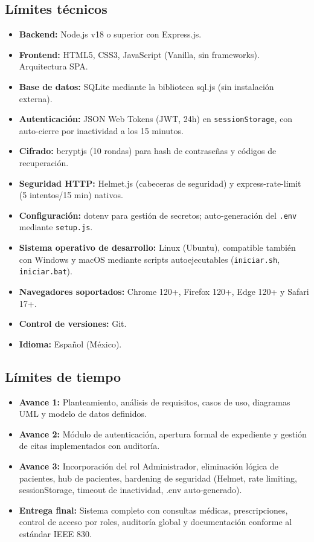 \documentclass[11pt,a4paper]{article}
\begin{document}
\subsection{Límites técnicos}

\begin{itemize}
    \item \textbf{Backend:} Node.js v18 o superior con Express.js.
    \item \textbf{Frontend:} HTML5, CSS3, JavaScript (Vanilla, sin frameworks). Arquitectura SPA.
    \item \textbf{Base de datos:} SQLite mediante la biblioteca sql.js (sin instalación externa).
    \item \textbf{Autenticación:} JSON Web Tokens (JWT, 24h) en \texttt{sessionStorage}, con auto-cierre por inactividad a los 15 minutos.
    \item \textbf{Cifrado:} bcryptjs (10 rondas) para hash de contraseñas y códigos de recuperación.
    \item \textbf{Seguridad HTTP:} Helmet.js (cabeceras de seguridad) y express-rate-limit (5 intentos/15 min) nativos.
    \item \textbf{Configuración:} dotenv para gestión de secretos; auto-generación del \texttt{.env} mediante \texttt{setup.js}.
    \item \textbf{Sistema operativo de desarrollo:} Linux (Ubuntu), compatible también con Windows y macOS mediante scripts autoejecutables (\texttt{iniciar.sh}, \texttt{iniciar.bat}).
    \item \textbf{Navegadores soportados:} Chrome 120+, Firefox 120+, Edge 120+ y Safari 17+.
    \item \textbf{Control de versiones:} Git.
    \item \textbf{Idioma:} Español (México).
\end{itemize}

\subsection{Límites de tiempo}

\begin{itemize}
    \item \textbf{Avance 1:} Planteamiento, análisis de requisitos, casos de uso, diagramas UML y modelo de datos definidos.
    \item \textbf{Avance 2:} Módulo de autenticación, apertura formal de expediente y gestión de citas implementados con auditoría.
    \item \textbf{Avance 3:} Incorporación del rol Administrador, eliminación lógica de pacientes, hub de pacientes, hardening de seguridad (Helmet, rate limiting, sessionStorage, timeout de inactividad, .env auto-generado).
    \item \textbf{Entrega final:} Sistema completo con consultas médicas, prescripciones, control de acceso por roles, auditoría global y documentación conforme al estándar IEEE 830.
\end{itemize}
\end{document}
